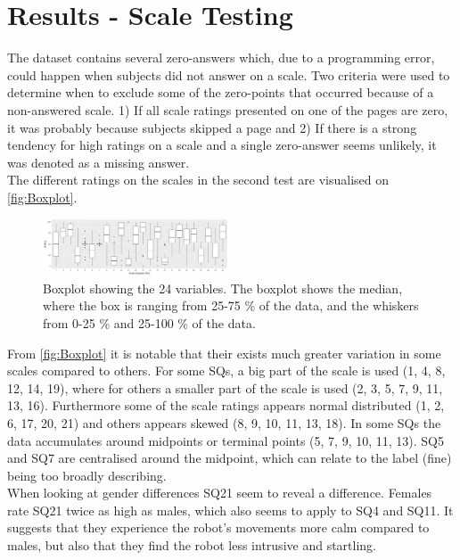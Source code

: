 \section{Results - Scale Testing}
\label{ResultsScaleTesting}
%
The dataset contains several zero-answers which, due to a programming error, could happen when subjects did not answer on a scale. Two criteria were used to determine when to exclude some of the zero-points that occurred because of a non-answered scale. 1) If all scale ratings presented on one of the pages are zero, it was probably because subjects skipped a page and 2) If there is a strong tendency for high ratings on a scale and a single zero-answer seems unlikely, it was denoted as a missing answer.\\

\noindent
The different ratings on the scales in the second test are visualised on \autoref{fig:Boxplot}.
%
\begin{figure}[H]
	\centering
	\includegraphics[width = 0.49\textwidth]{Figure/Boksplot24uden0}
	\setlength{} 
	\caption{Boxplot showing the 24 variables. The boxplot shows the median, where the box is ranging from 25-75 \% of the data, and the whiskers from 0-25 \% and 25-100 \% of the data.}
	\label{fig:Boxplot}
\end{figure}
\noindent
%
From \autoref{fig:Boxplot} it is notable that their exists much greater variation in some scales compared to others. For some SQs, a big part of the scale is used (1, 4, 8, 12, 14, 19), where for others a smaller part of the scale is used (2, 3, 5, 7, 9, 11, 13, 16). Furthermore some of the scale ratings appears normal distributed (1, 2, 6, 17, 20, 21) and others appears skewed (8, 9, 10, 11, 13, 18). In some SQs the data accumulates around midpoints or terminal points (5, 7, 9, 10, 11, 13). SQ5 and SQ7 are centralised around the midpoint, which can relate to the label (fine) being too broadly describing. \\ 

\noindent
When looking at gender differences SQ21 seem to reveal a difference. Females rate SQ21 twice as high as males, which also seems to apply to SQ4 and SQ11. It suggests that they experience the robot's movements more calm compared to males, but also that they find the robot less intrusive and startling.\\

